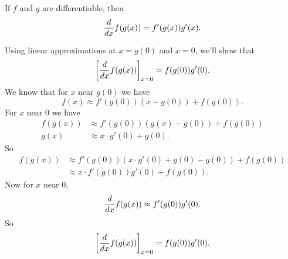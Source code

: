 \documentclass{ximera}
\begin{document}
\begin{theorem}
If $f$ and $g$ are differentiable, then
\[
\frac{d}{dx} f(g(x)) = f'(g(x))g'(x).
\]
\begin{explanation}
   Using linear approximations at $x=g(0)$ and $x=0$, we'll show that
  \[
  \bigg[ \frac{d}{dx} f(g(x)) \bigg]_{x=0} = f(g(0))g'(0).
  \]
  We know that for $x$ near $g(0)$ we have
  \[
  f(x) \approx f'(g(0)) (x-g(0)) + f(g(0)).
  \]
  For $x$ near $0$ we have
  \begin{align*}
    f(g(x)) &\approx f'(g(0)) (g(x)-g(0)) + f(g(0))\\
    g(x) &\approx x\cdot g'(0) + g(0).
  \end{align*}
  So
  \begin{align*}
  f(g(x)) &\approx f'(g(0)) (x\cdot g'(0) + g(0)-g(0)) + f(g(0))\\
  &\approx x\cdot f'(g(0))g'(0) + f(g(0)).
  \end{align*}
  Now for $x$ near $0$,
  \[
  \frac{d}{dx} f(g(x)) \approx f'(g(0))g'(0).
  \]
  So
  \[
  \bigg[ \frac{d}{dx} f(g(x)) \bigg]_{x=0} = f(g(0))g'(0).
  \]
\end{explanation}
\end{theorem}



          

\end{document}
